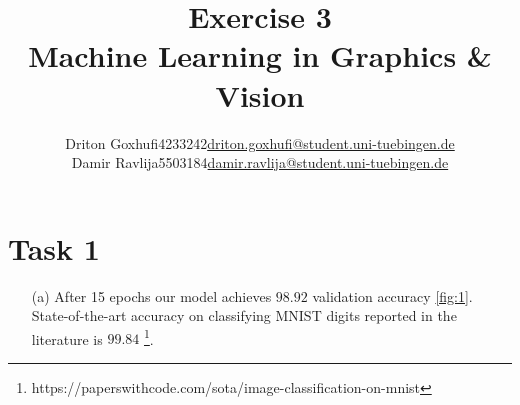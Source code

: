 \documentclass [a4paper, 11pt] {article}
\makeatletter
\newcommand{\courseName}{Machine Learning in Graphics \& Vision}
\newcommand{\homeworkNum}{3}
\newcommand{\studentOne}{Driton Goxhufi}
\newcommand{\studentTwo} {Damir Ravlija}
\newcommand{\matrikelNrStOne}{4233242}
\newcommand{\matrikelNrStTwo}{5503184}
\newcommand{\mailStOne}{driton.goxhufi@student.uni-tuebingen.de}
\newcommand{\mailStTwo}{damir.ravlija@student.uni-tuebingen.de}
\makeatother
\begin{document}
	
\title{\vspace{-1.5cm}\textbf{Exercise \homeworkNum} \\ 
	\courseName}
\author{\begin{tabular}{lcr}
		\studentOne & \matrikelNrStOne & \href{mailto:\mailStOne}{\mailStOne} \\
		\studentTwo & \matrikelNrStTwo & \href{mailto:\mailStTwo}{\mailStTwo} 
\end{tabular}}	
\date{}
\maketitle


\section{Task 1}
\begin{enumerate}
\item[(a)]
After 15 epochs our model achieves $98.92$ validation accuracy \ref{fig:1}.
State-of-the-art accuracy on classifying MNIST digits reported in the literature is $	99.84$ \footnote{https://paperswithcode.com/sota/image-classification-on-mnist}.


\end{enumerate}
\end{document}
